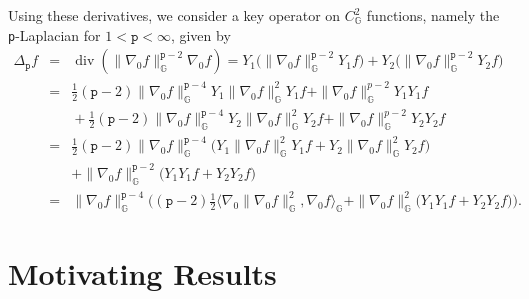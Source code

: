 \documentclass[12pt]{amsart}
\theoremstyle{plain}
\theoremstyle{definition}
\numberwithin{equation}{section}
\begin{document}
Using these derivatives, we consider a key operator on $C^2_{\mathbb{G}}$ functions, namely the {\texttt{p}}-Laplacian for $1<{\texttt{p}}<\infty$, given by
\begin{eqnarray}
\Delta_{\texttt{p}} f & = & {\operatorname{div}}(\|\nabla_{0} f\|_{\mathbb{G}}^{{\texttt{p}}-2}\nabla_{0}f)   =  Y_1\big(\|\nabla_{0} f\|_{\mathbb{G}}^{{\texttt{p}}-2}Y_1f\big)+Y_2\big(\|\nabla_{0} f\|_{\mathbb{G}}^{{\texttt{p}}-2}Y_2f\big)  \nonumber\\
& = & \frac{1}{2}({\texttt{p}}-2)\|\nabla_{0} f\|_{\mathbb{G}}^{{\texttt{p}}-4}Y_1\|\nabla_{0} f\|_{\mathbb{G}}^{2}Y_1f+\|\nabla_{0} f\|_{\mathbb{G}}^{p-2}Y_1Y_1f  \nonumber\\
&  & \mbox{} +\frac{1}{2}({\texttt{p}}-2)\|\nabla_{0} f\|_{\mathbb{G}}^{{\texttt{p}}-4}Y_2\|\nabla_{0} f\|_{\mathbb{G}}^{2}Y_2f+\|\nabla_{0} f\|_{\mathbb{G}}^{p-2}Y_2Y_2f \nonumber\\
& = & \frac{1}{2}({\texttt{p}}-2)\|\nabla_{0} f\|_{\mathbb{G}}^{{\texttt{p}}-4}\big(Y_1\|\nabla_{0} f\|_{\mathbb{G}}^{2}Y_1f+Y_2\|\nabla_{0} f\|_{\mathbb{G}}^{2}Y_2f\big)  \label{reductiong}\\
& & \mbox{} +\|\nabla_{0} f\|_{\mathbb{G}}^{{\texttt{p}}-2}\big(Y_1Y_1f+Y_2Y_2f\big)  \nonumber\\
& = &\|\nabla_{0} f\|_{\mathbb{G}}^{{\texttt{p}}-4}\bigg(({\texttt{p}}-2)\frac{1}{2}
{\langle {\nabla_{0}\|\nabla_{0} f\|_{\mathbb{G}}^{2}},{\nabla_{0} f} \rangle_\mathbb{G}}+\|\nabla_{0} f\|_{\mathbb{G}}^{2}\big(Y_1Y_1f+Y_2Y_2f\big)\bigg). \nonumber  
\end{eqnarray}
\section{Motivating Results}
\end{document}
